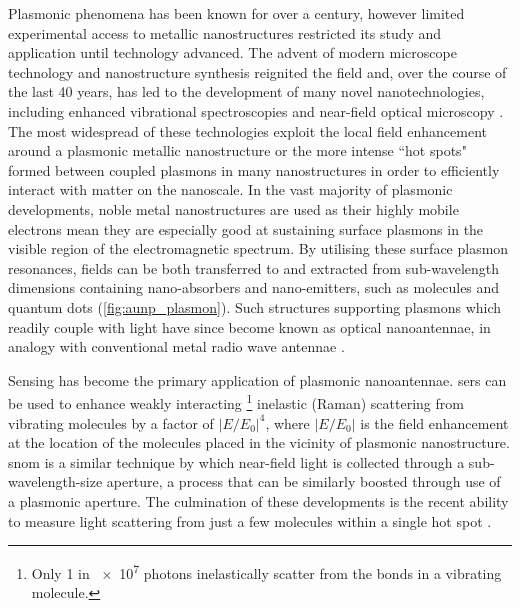 \documentclass[12pt, a4paper, twoside]{book}
\begin{document}
Plasmonic phenomena has been known for over a century, however limited experimental access to metallic nanostructures restricted its study and application until technology advanced. The advent of modern microscope technology and nanostructure synthesis reignited the field and, over the course of the last 40 years, has led to the development of many novel nanotechnologies, including enhanced vibrational spectroscopies \cite{fleischmann1974, jeanmaire1977} and near-field optical microscopy \cite{ash1972super, pohl1984optical, lewis1984development, pohl1986optical, harootunian1986super, betzig1988near}. The most widespread of these technologies exploit the local field enhancement around a plasmonic metallic nanostructure or the more intense ``hot spots" formed between coupled plasmons in many nanostructures in order to efficiently interact with matter on the nanoscale. In the vast majority of plasmonic developments, noble metal nanostructures are used as their highly mobile electrons mean they are especially good at sustaining surface plasmons in the visible region of the electromagnetic spectrum. By utilising these surface plasmon resonances, fields can be both transferred to and extracted from sub-wavelength dimensions containing nano-absorbers and nano-emitters, such as molecules and quantum dots (\autoref{fig:aunp_plasmon}). Such structures supporting plasmons which readily couple with light have since become known as optical nanoantennae, in analogy with conventional metal radio wave antennae \cite{novotny2011}.

Sensing has become the primary application of plasmonic nanoantennae. \Gls{sers} can be used to enhance weakly interacting%
\footnote{Only 1 in \num{e7} photons inelastically scatter from the bonds in a vibrating molecule.}
inelastic (Raman) scattering from vibrating molecules \cite{raman1928} by a factor of $|E/E_0|^4$, where $|E/E_0|$ is the field enhancement at the location of the molecules placed in the vicinity of plasmonic nanostructure. \Gls{snom} is a similar technique by which near-field light is collected through a sub-wavelength-size aperture, a process that can be similarly boosted through use of a plasmonic aperture. The culmination of these developments is the recent ability to measure light scattering from just a few molecules within a single hot spot \cite{zhang2013}.
\end{document}
